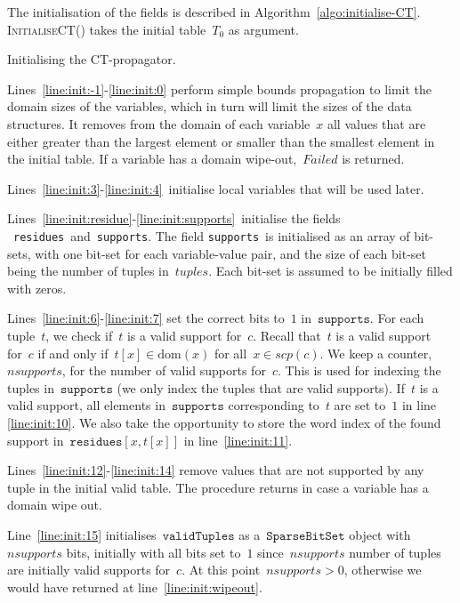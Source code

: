 \documentclass[a4paper,11pt]{article}
\newcommand{\Algoref}[1]{Algorithm~\ref{#1}}
\newcommand{\Lineref}[1]{Line~\ref{#1}}
\newcommand{\Linesref}[2]{Lines~\ref{#1}-\ref{#2}}
\newcommand{\Dom}[1]{\text{dom}({#1})}
\newcommand{\SparseBitSet}{\texttt{SparseBitSet}}
\newcommand{\CurrTable}{\texttt{validTuples}}
\newcommand{\Supports}{\texttt{supports}}
\newcommand{\Residues}{\texttt{residues}}
\def\InitialiseCT{\textsc{InitialiseCT}}
\newcommand{\localvar}[1]{\mathit{#1}}
\numberwithin{equation}{section}
\begin{document}


The initialisation of the fields is described in
\Algoref{algo:initialise-CT}. \InitialiseCT() takes the 
initial table~$\localvar{T_0}$ as argument.

\begin{algorithm}[H]
  \begin{algorithmic}[1]  %
    
  \end{algorithmic}
  \caption{Initialising the CT-propagator.}
  \label{algo:initialise-CT}
\end{algorithm}

\Linesref{line:init:-1}{line:init:0} perform simple bounds
  propagation to limit the domain sizes of the variables,
  which in turn will limit the sizes of the data structures.
  It removes
  from the domain of each variable~$x$ all values that are either greater 
  than the largest element or smaller than the smallest element in the
  initial table. If a variable has a domain wipe-out,~$Failed$ is returned.

\Linesref{line:init:3}{line:init:4}~initialise local variables that will be 
used later.

\Linesref{line:init:residue}{line:init:supports}~initialise the fields
~\Residues~and~\Supports.
The field \Supports~is initialised as an array of bit-sets, with one bit-set for each
variable-value pair, and the size of each
bit-set being the number of tuples in~$\localvar{tuples}$. Each bit-set is assumed
to be initially filled with zeros.

\Linesref{line:init:6}{line:init:7} set the correct bits to~$1$ in~$\Supports$.
For each tuple~$t$, we check if~$t$ is a valid support for~$c$. Recall that~$t$ is
a valid support for~$c$ if and only if~$t[x] \in \Dom{x}$ for all~$x \in scp(c)$.
We keep a counter,~$nsupports$, for the number of valid supports for~$c$.
This is used for indexing the tuples in~$\Supports$ (we only index the tuples
that are valid supports).
If~$t$ is a valid support,
all elements in~$\Supports$ corresponding to~$t$ are set to~$1$ in
line \ref{line:init:10}. We also take the opportunity to store the word index
of the found support in~$\Residues[x,t[x]]$
in line~\ref{line:init:11}.

\Linesref{line:init:12}{line:init:14} remove values that are not supported
by any tuple in the initial valid table. The procedure returns in case a variable
has a domain wipe out.

\Lineref{line:init:15} initialises~$\CurrTable$ as a~$\SparseBitSet$ object with
$nsupports$ bits, initially with all bits set to~$1$ since~$nsupports$
number of tuples are initially valid supports for~$c$.
At this point~$\localvar{nsupports} > 0$,
otherwise we would have returned at line~\ref{line:init:wipeout}.
\end{document}
